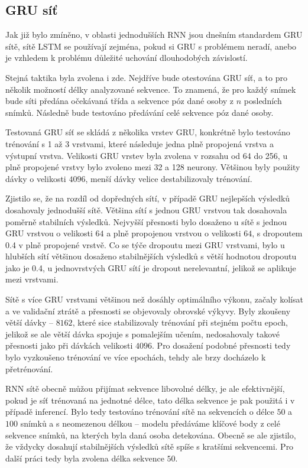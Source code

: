 \subsection{GRU síť}

Jak již bylo zmíněno, v oblasti jednodušších RNN jsou dnešním standardem GRU
sítě, sítě LSTM se používají zejména, pokud si GRU s problémem neradí, anebo je
vzhledem k problému důležité uchování dlouhodobých závislostí.

Stejná taktika byla zvolena i zde. Nejdříve bude otestována GRU síť, a to pro
několik možností délky analyzované sekvence. To znamená, že pro každý snímek
bude síti předána očekávaná třída a sekvence póz dané osoby z $n$ posledních
snímků. Následně bude testováno předávání celé sekvence póz dané osoby.

Testovaná GRU síť se skládá z několika vrstev GRU, konkrétně bylo testováno
trénování s 1 až 3 vrstvami, které následuje jedna plně propojená vrstva a
výstupní vrstva. Velikosti GRU vrstev byla zvolena v rozsahu od 64 do 256, u
plně propojené vrstvy bylo zvoleno mezi 32 a 128 neurony. Většinou byly použity
dávky o velikosti $4096$, menší dávky velice destabilizovaly trénování.

Zjistilo se, že na rozdíl od dopředných sítí, v případě GRU nejlepších výsledků
dosahovaly jednodušší sítě. Většina sítí s jednou GRU vrstvou tak dosahovala
poměrně stabilních výsledků. Nejvyšší přesnosti bylo dosaženo u sítě s jednou
GRU vrstvou o velikosti $64$ a plně propojenou vrstvou o velikosti $64$, s
dropoutem 0.4 v plně propojené vrstvě. Co se týče dropoutu mezi GRU vrstvami,
bylo u hlubších sítí většinou dosaženo stabilnějších výsledků s větší hodnotou
dropoutu jako je 0.4, u jednovrstvých GRU sítí je dropout nerelevantní, jelikož
se aplikuje mezi vrstvami.

Sítě s více GRU vrstvami většinou než dosáhly optimálního výkonu, začaly
kolísat a ve validační ztrátě a přesnosti se objevovaly obrovské výkyvy. Byly
zkoušeny větší dávky – $8162$, které sice stabilizovaly trénování při stejném
počtu epoch, jelikož se ale větší dávka spojuje s pomalejším učením,
nedosahovaly takové přesnosti jako při dávkách velikosti $4096$. Pro dosažení
podobné přesnosti tedy bylo vyzkoušeno trénování ve více epochách, tehdy ale
brzy docházelo k přetrénování.

RNN sítě obecně můžou přijímat sekvence libovolné délky, je ale efektivnější,
pokud je síť trénovaná na jednotné délce, tato délka sekvence je pak použitá i
v případě inferencí. Bylo tedy testováno trénování sítě na sekvencích o délce
$50$ a $100$ snímků a s neomezenou délkou – modelu předáváme klíčové body z
celé sekvence snímků, na kterých byla daná osoba detekována. Obecně se ale
zjistilo, že vždycky dosahují stabilnějších výsledků sítě spíše s kratšími
sekvencemi. Pro další práci tedy byla zvolena délka sekvence $50$.

